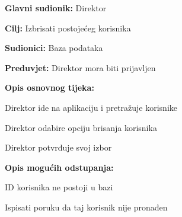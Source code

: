 			
			\noindent {}
			\begin{packed_item}
				
				\item \textbf{Glavni sudionik: } Direktor
				\item  \textbf{Cilj:} Izbrisati postojećeg korisnika
				\item  \textbf{Sudionici:} Baza podataka
				\item  \textbf{Preduvjet:} Direktor mora biti prijavljen
				\item  \textbf{Opis osnovnog tijeka:}
				
				\item[] \begin{packed_enum}
					
					\item Direktor ide na aplikaciju i pretražuje korisnike
					\item Direktor odabire opciju brisanja korisnika
					\item Direktor potvrđuje svoj izbor
				\end{packed_enum}
				
				\item  \textbf{Opis mogućih odstupanja:}
				
				\item[] \begin{packed_item}
					
					\item[2.a] ID korisnika ne postoji u bazi
					\item[] \begin{packed_enum}
						
						\item Ispisati poruku da taj korisnik nije pronađen
						
					\end{packed_enum}
					
				\end{packed_item}
			\end{packed_item}
			
